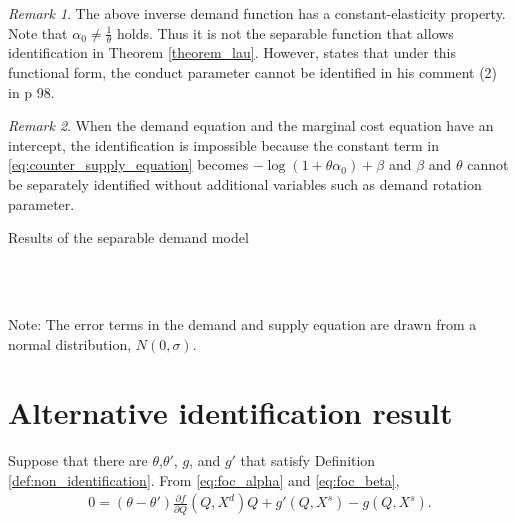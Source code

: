 \documentclass[11pt, a4paper]{article}
\theoremstyle{remark}
\newtheorem{remark}{Remark}
\begin{document}
\begin{remark}
    The above inverse demand function has a constant-elasticity property. 
    Note that $\alpha_0 \ne \frac{1}{\theta}$ holds.
    Thus it is not the separable function that allows identification in Theorem \ref{theorem_lau}.
    However, \citet{lau1982identifying} states that under this functional form, the conduct parameter cannot be identified in his comment (2) in p 98.
\end{remark}

\begin{remark}
    When the demand equation and the marginal cost equation have an intercept, the identification is impossible because the constant term in \eqref{eq:counter_supply_equation} becomes $-\log(1+\theta \alpha_0) + \beta$ and $\beta$ and $\theta$ cannot be separately identified without additional variables such as demand rotation parameter.
\end{remark}

\begin{table}[!htbp]
  \begin{center}
      \caption{Results of the separable demand model}
      \label{tb:counterexample_for_Lau1982_sigma_0.001_bias_rmse} 
      \subfloat[$\sigma=0.001$]{}\\
      \subfloat[$\sigma=0.5$]{}\\
      \subfloat[$\sigma=1.0$]{}
  \end{center}
  \footnotesize
  Note: The error terms in the demand and supply equation are drawn from a normal distribution, $N(0,\sigma)$.
\end{table} 

\section{Alternative identification result}

Suppose that there are $\theta$,$\theta'$, $g$, and $g'$ that satisfy Definition \ref{def:non_identification}.
From \eqref{eq:foc_alpha} and \eqref{eq:foc_beta},
\begin{align}
    0 = (\theta - \theta')\frac{\partial f}{\partial Q}(Q,X^{d})Q + g'(Q,X^{s}) - g(Q,X^{s}). 
\end{align}
\end{document}
